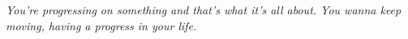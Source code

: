\thispagestyle{empty}
\vspace*{\fill}
\emph{
    You're progressing on something and that's what it's all about. You wanna keep moving, having a progress in your life.
}
\vspace*{\fill}


